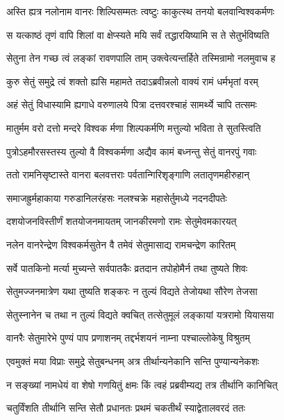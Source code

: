 \twolineshloka
{अस्ति ह्यत्र नलोनाम वानरः शिल्पिसम्मतः}
{त्वष्टुः काकुत्स्थ तनयो बलवान्विश्वकर्मणः}%

\twolineshloka
{स यत्काष्ठं तृणं वापि शिलां वा क्षेप्स्यते मयि}
{सर्वं तद्धारयिष्यामि स ते सेतुर्भविष्यति}%

\twolineshloka
{सेतुना तेन गच्छ त्वं लङ्कां रावणपालि ताम्}
{उक्त्वेत्यन्तर्हिते तस्मिन्रामो नलमुवाच ह}%

\twolineshloka
{कुरु सेतुं समुद्रे त्वं शक्तो ह्यसि महामते}
{तदाऽब्रवीन्नलो वाक्यं रामं धर्मभृतां वरम्}%

\twolineshloka
{अहं सेतुं विधास्यामि ह्यगाधे वरुणालये}
{पित्रा दत्तवरश्चाहं सामर्थ्ये चापि तत्समः}%

\twolineshloka
{मातुर्मम वरो दत्तो मन्दरे विश्वक र्मणा}
{शिल्पकर्मणि मत्तुल्यो भविता ते सुतस्त्विति}%

\twolineshloka
{पुत्रोऽहमौरसस्तस्य तुल्यो वै विश्वकर्मणा}
{अद्यैव कामं बध्नन्तु सेतुं वानरपुं गवाः}%

\twolineshloka
{ततो रामनिसृष्टास्ते वानरा बलवत्तराः}
{पर्वतान्गिरिशृङ्गाणि लतातृणमहीरुहान्}%

\twolineshloka
{समाजह्रुर्महाकाया गरुडानिलरंहसः}
{नलश्चक्रे महासेर्तुमध्ये नदनदीपतेः}%

\twolineshloka
{दशयोजनविस्तीर्णं शतयोजनमायतम्}
{जानकीरमणो रामः सेतुमेवमकारयत्}%

\twolineshloka
{नलेन वानरेन्द्रेण विश्वकर्मसुतेन वै}
{तमेवं सेतुमासाद्य रामचन्द्रेण कारितम्}%

\twolineshloka
{सर्वे पातकिनो मर्त्या मुच्यन्ते सर्वपातकैः}
{व्रतदान तपोहोमैर्न तथा तुष्यते शिवः}%

\twolineshloka
{सेतुमज्जनमात्रेण यथा तुष्यति शङ्करः}
{न तुल्यं विद्यते तेजोयथा सौरेण तेजसा}%

\twolineshloka
{सेतुस्नानेन च तथा न तुल्यं विद्यते क्वचित्}
{तत्सेतुमूलं लङ्कायां यत्ररामो यियासया}%

\twolineshloka
{वानरैः सेतुमारेभे पुण्यं पाप प्रणाशनम्}
{तद्दर्भशयनं नाम्ना पश्चाल्लोकेषु विश्रुतम्}%

\twolineshloka
{एवमुक्तं मया विप्राः समुद्रे सेतुबन्धनम्}
{अत्र तीर्थान्यनेकानि सन्ति पुण्यान्यनेकशः}%

\twolineshloka
{न सङ्ख्यां नामधेयं वा शेषो गणयितुं क्षमः}
{किं त्वहं प्रब्रवीम्यद्य तत्र तीर्थानि कानिचित्}%

\twolineshloka
{चतुर्विंशति तीर्थानि सन्ति सेतौ प्रधानतः}
{प्रथमं चकतीर्थं स्याद्वेतालवरदं ततः}%

